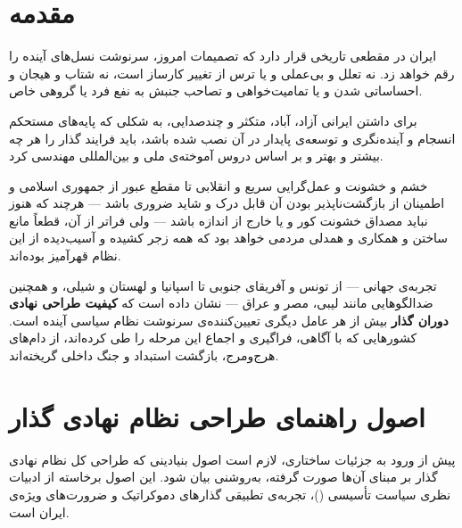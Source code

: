 \mainmatter
\pagestyle{fancy}

\chapter{مقدمه}
\label{ch:intro}

ایران در مقطعی تاریخی قرار دارد که تصمیمات امروز، سرنوشت نسل‌های آینده را رقم خواهد
زد. نه تعلل و بی‌عملی و یا ترس از تغییر کارساز است، نه شتاب و هیجان و احساساتی شدن
و یا تمامیت‌خواهی و تصاحب جنبش به نفع فرد یا گروهی خاص.

برای داشتن ایرانی آزاد، آباد، متکثر و چندصدایی، به شکلی که پایه‌های مستحکم انسجام
و آینده‌نگری و توسعه‌ی پایدار در آن نصب شده باشد، باید فرایند گذار را هر چه بیشتر
و بهتر و بر اساس دروس آموخته‌ی ملی و بین‌المللی مهندسی کرد.

خشم و خشونت و عمل‌گرایی سریع و انقلابی تا مقطع عبور از جمهوری اسلامی و اطمینان از
بازگشت‌ناپذیر بودن آن قابل درک و شاید ضروری باشد --- هرچند که هنوز نباید مصداق
خشونت کور و یا خارج از اندازه باشد --- ولی فراتر از آن، قطعاً مانع ساختن و همکاری
و همدلی مردمی خواهد بود که همه زجر کشیده و آسیب‌دیده از این نظام قهرآمیز بوده‌اند.

\begin{summarybox}
	تجربه‌ی جهانی --- از تونس و آفریقای جنوبی تا اسپانیا و لهستان و شیلی، و همچنین
	ضدالگوهایی مانند لیبی، مصر و عراق --- نشان داده است که \textbf{کیفیت طراحی نهادی
		دوران گذار} بیش از هر عامل دیگری تعیین‌کننده‌ی سرنوشت نظام سیاسی آینده است.
	کشورهایی که با آگاهی، فراگیری و اجماع این مرحله را طی کرده‌اند، از دام‌های هرج‌ومرج،
	بازگشت استبداد و جنگ داخلی گریخته‌اند.
\end{summarybox}

\chapter{اصول راهنمای طراحی نظام نهادی گذار}
\label{ch:principles}

پیش از ورود به جزئیات ساختاری، لازم است اصول بنیادینی که طراحی کل نظام نهادی گذار
بر مبنای آن‌ها صورت گرفته، به‌روشنی بیان شود. این اصول برخاسته از ادبیات نظری سیاست
تأسیسی ()، تجربه‌ی تطبیقی گذارهای دموکراتیک و ضرورت‌های
ویژه‌ی ایران است.

